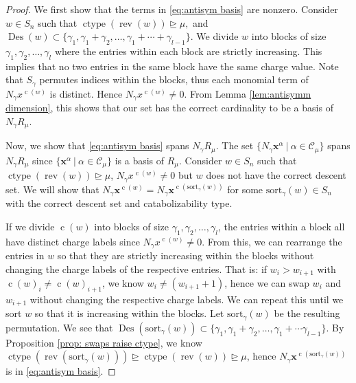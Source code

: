 \documentclass[ALCO, Unicode]{cedram}
\DeclareMathOperator{\ctype}{ctype}
\DeclareMathOperator{\rev}{rev}
\DeclareMathOperator{\cw}{c}
\DeclareMathOperator{\des}{Des}
\begin{document}
\begin{proof}

We first show that the terms in \eqref{eq:antisym basis} are nonzero. 
Consider $w\in S_n$ such that $\ctype(\rev(w)) \unrhd \mu,$ and $\des(w) \subset \{\gamma_1,\gamma_1 + \gamma_2, \dots, \gamma_1 + \cdots + \gamma_{l-1}\}.$ 
We divide $w$ into blocks of size $\gamma_1,\gamma_2,\dots, \gamma_{l}$ where the entries within each block are strictly increasing. 
This implies that no two entries in the same block have the same charge value.
Note that $S_\gamma$ permutes indices within the blocks, thus each monomial term of $N_{\gamma}x^{\cw(w)}$ is distinct. 
Hence $N_{\gamma} x^{\cw(w)} \neq 0$.
From Lemma \ref{lem:antisymm dimension}, this shows that our set has the correct cardinality to be a basis of $N_{\gamma}R_{\mu}$. 

Now, we show that \eqref{eq:antisym basis} spans $N_\gamma R_{\mu}$. The set $\{N_\gamma \mathbf{x}^\alpha \ | \ \alpha \in \mathcal{C}_\mu\}$
spans $N_\gamma R_{\mu}$ since $\{\mathbf{x}^\alpha \ | \ \alpha \in \mathcal{C}_\mu\}$ is a basis of $R_{\mu}$.
Consider $w\in S_n$ such that $\ctype(\rev(w))\unrhd\mu$, $N_\gamma x^{\cw(w)} \neq 0$ but $w$ does not have the correct descent set. We will show that $N_\gamma\mathbf{x}^{\cw(w)} = N_\gamma\mathbf{x}^{\cw(\text{sort}_\gamma (w))}$  for some $\text{sort}_\gamma(w)\in S_n$ with the correct descent set and catabolizability type.

If we divide $\cw(w)$ into blocks of size $\gamma_1,\gamma_2,\dots, \gamma_{l}$, the entries within a block all have distinct charge labels since $N_\gamma x^{\cw(w)} \neq 0$. 
From this, we can rearrange the entries in $w$ so that they are strictly increasing within the blocks without changing the charge labels of the respective entries. That is: if $w_i > w_{i+1}$ with $\cw(w)_i \neq \cw(w)_{i+1}$, we know $w_i \neq (w_{i+1} + 1)$, hence we can swap $w_i$ and $w_{i+1}$ without changing the respective charge labels.
We can repeat this until we sort $w$ so that it is increasing within the blocks. Let $\text{sort}_\gamma(w)$ be the resulting permutation.
We see that $\des(\text{sort}_\gamma(w) )\subset \{\gamma_1,\gamma_1+\gamma_2,\dots, \gamma_1+ \cdots \gamma_{l-1}\}.$ 
 By Proposition \ref{prop: swaps raise ctype}, we know $\ctype(\rev(\text{sort}_\gamma(w))) \unrhd \ctype(\rev(w)) \unrhd \mu$, hence $N_\gamma \mathbf{x}^{\cw(\text{sort}_\gamma(w))}$ is in  \eqref{eq:antisym basis}.
\end{proof}
\end{document}
